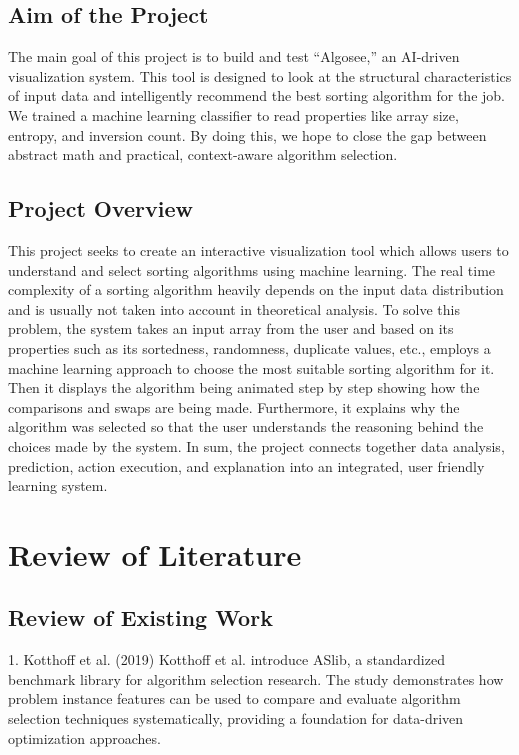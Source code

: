 \documentclass[12pt,a4paper,oneside,openany]{report}
\begin{document}
\section{Aim of the Project}
The main goal of this project is to build and test ``Algosee,'' an AI-driven visualization system. This tool is designed to look at the structural characteristics of input data and intelligently recommend the best sorting algorithm for the job. We trained a machine learning classifier to read properties like array size, entropy, and inversion count. By doing this, we hope to close the gap between abstract math and practical, context-aware algorithm selection.

\section{Project Overview}
This project seeks to create an interactive visualization tool which allows users to understand and select sorting algorithms using machine learning. The real time complexity of a sorting algorithm heavily depends on the input data distribution and is usually not taken into account in theoretical analysis. To solve this problem, the system takes an input array from the user and based on its properties such as its sortedness, randomness, duplicate values, etc., employs a machine learning approach to choose the most suitable sorting algorithm for it. Then it displays the algorithm being animated step by step showing how the comparisons and swaps are being made. Furthermore, it explains why the algorithm was selected so that the user understands the reasoning behind the choices made by the system. In sum, the project connects together data analysis, prediction, action execution, and explanation into an integrated, user friendly learning system.

\chapter{Review of Literature}
\section{Review of Existing Work}

1. Kotthoff et al. (2019) \cite{Kotthoff2019}
Kotthoff et al. introduce ASlib, a standardized benchmark library for algorithm selection research. The study demonstrates how problem instance features can be used to compare and evaluate algorithm selection techniques systematically, providing a foundation for data-driven optimization approaches.\\
\end{document}

